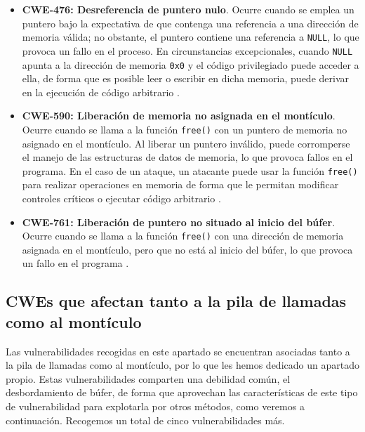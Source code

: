 \documentclass[12pt, a4paper, twoside]{article}
\begin{document}
\begin{itemize}
	\item \textbf{CWE-476: Desreferencia de puntero nulo}. Ocurre cuando se emplea un puntero bajo la expectativa de que contenga una referencia a una dirección de memoria válida; no obstante, el puntero contiene una referencia a \texttt{NULL}, lo que provoca un fallo en el proceso. En circunstancias excepcionales, cuando \texttt{NULL} apunta a la dirección de memoria \texttt{0x0} y el código privilegiado puede acceder a ella, de forma que es posible leer o escribir en dicha memoria, puede derivar en la ejecución de código arbitrario \cite{mitre-cwe-476}.
	
	\item \textbf{CWE-590: Liberación de memoria no asignada en el montículo}. Ocurre cuando se llama a la función \texttt{free()} con un puntero de memoria no asignado en el montículo. Al liberar un puntero inválido, puede corromperse el manejo de las estructuras de datos de memoria, lo que provoca fallos en el programa. En el caso de un ataque, un atacante puede usar la función \texttt{free()} para realizar operaciones en memoria de forma que le permitan modificar controles críticos o ejecutar código arbitrario \cite{mitre-cwe-590}.
	
	\item \textbf{CWE-761: Liberación de puntero no situado al inicio del búfer}. Ocurre cuando se llama a la función \texttt{free()} con una dirección de memoria asignada en el montículo, pero que no está al inicio del búfer, lo que provoca un fallo en el programa \cite{mitre-cwe-761}.
\end{itemize}

\subsection{CWEs que afectan tanto a la pila de llamadas como al montículo}
\label{sec:cwe-common}
Las vulnerabilidades recogidas en este apartado se encuentran asociadas tanto a la pila de llamadas como al montículo, por lo que les hemos dedicado un apartado propio. Estas vulnerabilidades comparten una debilidad común, el desbordamiento de búfer, de forma que aprovechan las características de este tipo de vulnerabilidad para explotarla por otros métodos, como veremos a continuación. Recogemos un total de cinco vulnerabilidades más.
\end{document}
